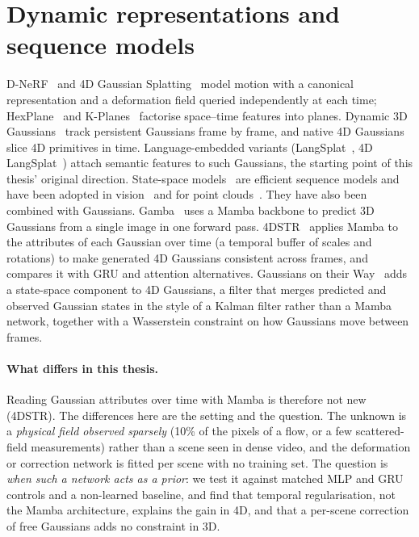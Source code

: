 \section{Dynamic representations and sequence models}
D-NeRF~\citep{pumarola2021dnerf} and 4D Gaussian Splatting~\citep{wu20244dgs} model motion with a canonical
representation and a deformation field queried independently at each time; HexPlane~\citep{cao2023hexplane} and
K-Planes~\citep{fridovich2023kplanes} factorise space--time features into planes. Dynamic 3D
Gaussians~\citep{luiten2024dynamic} track persistent Gaussians frame by frame, and native 4D
Gaussians~\citep{yang2024realtime4dgs} slice 4D primitives in time. Language-embedded variants
(LangSplat~\citep{qin2024langsplat}, 4D LangSplat~\citep{li2025langsplat4d}) attach semantic features to such
Gaussians, the starting point of this thesis' original direction. State-space
models~\citep{gu2022s4,gu2023mamba} are efficient sequence models and have been adopted in
vision~\citep{zhu2024visionmamba} and for point clouds~\citep{pointmamba}. They have also been combined with Gaussians.
Gamba~\citep{shen2025gamba} uses a Mamba backbone to predict 3D Gaussians from a single image in one forward pass.
4DSTR~\citep{liu2026fourdstr} applies Mamba to the attributes of each Gaussian over time (a temporal buffer of scales
and rotations) to make generated 4D Gaussians consistent across frames, and compares it with GRU and attention
alternatives. Gaussians on their Way~\citep{deng2024gaussiansontheirway} adds a state-space component to 4D Gaussians,
a filter that merges predicted and observed Gaussian states in the style of a Kalman filter rather than a Mamba
network, together with a Wasserstein constraint on how Gaussians move between frames.

\paragraph{What differs in this thesis.} Reading Gaussian attributes over time with Mamba is therefore not new
(4DSTR). The differences here are the setting and the question. The unknown is a \emph{physical field observed sparsely}
(10\% of the pixels of a flow, or a few scattered-field measurements) rather than a scene seen in dense video, and the
deformation or correction network is fitted per scene with no training set. The question is \emph{when such a network
acts as a prior}: we test it against matched MLP and GRU controls and a non-learned baseline, and find that temporal
regularisation, not the Mamba architecture, explains the gain in 4D, and that a per-scene correction of free Gaussians
adds no constraint in 3D.

